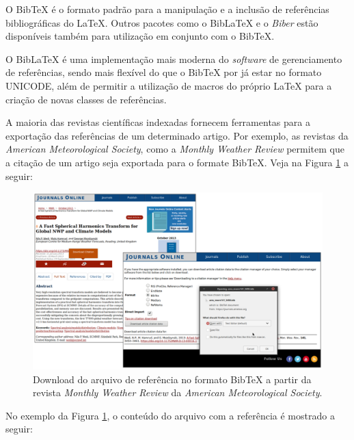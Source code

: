 O Bib\TeX{} é o formato padrão para a manipulação e a inclusão de referências bibliográficas do \LaTeX{}. Outros pacotes como o Bib\LaTeX{} e o \textit{Biber} estão disponíveis também para utilização em conjunto com o Bib\TeX{}.

O Bib\LaTeX{} é uma implementação mais moderna do \textit{software} de gerenciamento de referências, sendo mais flexível do que o Bib\TeX{} por já estar no formato UNICODE, além de permitir a utilização de macros do próprio \LaTeX{} para a criação de novas classes de referências.

A maioria das revistas científicas indexadas fornecem ferramentas para a exportação das referências de um determinado artigo. Por exemplo, as revistas da \textit{American Meteorological Society}, como a \textit{Monthly Weather Review} permitem que a citação de um artigo seja exportada para o formate Bib\TeX{}. Veja na Figura \ref{fig:exemplo_revista_ams_citacao} a seguir:

\begin{figure}[H]
\caption{Download do arquivo de referência no formato Bib\TeX{} a partir da revista \textit{Monthly Weather Review} da \textit{American Meteorological Society}.}
\vspace{6mm}
    \begin{center}
        \includegraphics[scale=0.4]{./docs/figs/exemplo_revista_ams_citacao.pdf}
    \end{center}
\vspace{4mm}
\label{fig:exemplo_revista_ams_citacao}
\end{figure}

No exemplo da Figura \ref{fig:exemplo_revista_ams_citacao}, o conteúdo do arquivo com a referência é mostrado a seguir:

